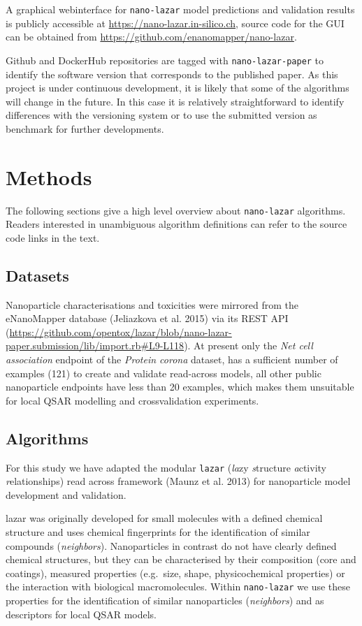 \documentclass[utf8]{frontiersHLTH} %
\begin{document}
A graphical webinterface for \texttt{nano-lazar} model predictions and
validation results is publicly accessible at
\url{https://nano-lazar.in-silico.ch}, source code for the GUI can be
obtained from \url{https://github.com/enanomapper/nano-lazar}.

Github and DockerHub repositories are tagged with
\texttt{nano-lazar-paper} to identify the software version that
corresponds to the published paper. As this project is under continuous
development, it is likely that some of the algorithms will change in the
future. In this case it is relatively straightforward to identify
differences with the versioning system or to use the submitted version
as benchmark for further developments.

\section{Methods}\label{methods}

The following sections give a high level overview about
\texttt{nano-lazar} algorithms. Readers interested in unambiguous
algorithm definitions can refer to the source code links in the text.

\subsection{Datasets}\label{datasets}

Nanoparticle characterisations and toxicities were mirrored from the
eNanoMapper database (Jeliazkova et al. 2015) via its REST API
(\url{https://github.com/opentox/lazar/blob/nano-lazar-paper.submission/lib/import.rb\#L9-L118}).
At present only the \emph{Net cell association} endpoint of the
\emph{Protein corona} dataset, has a sufficient number of examples (121)
to create and validate read-across models, all other public nanoparticle
endpoints have less than 20 examples, which makes them unsuitable for
local QSAR modelling and crossvalidation experiments.

\subsection{Algorithms}\label{algorithms}

For this study we have adapted the modular \texttt{lazar} (\emph{la}zy
\emph{s}tructure \emph{a}ctivity \emph{r}elationships) read across
framework (Maunz et al. 2013) for nanoparticle model development and
validation.

lazar was originally developed for small molecules with a defined
chemical structure and uses chemical fingerprints for the identification
of similar compounds (\emph{neighbors}). Nanoparticles in contrast do
not have clearly defined chemical structures, but they can be
characterised by their composition (core and coatings), measured
properties (e.g.~size, shape, physicochemical properties) or the
interaction with biological macromolecules. Within \texttt{nano-lazar}
we use these properties for the identification of similar nanoparticles
(\emph{neighbors}) and as descriptors for local QSAR models.
\end{document}
